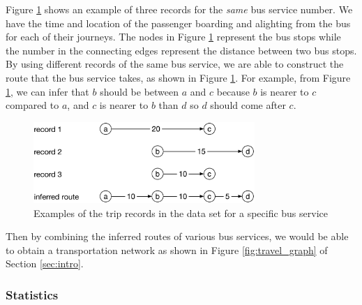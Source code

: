 \documentclass{sig-alternate}
\begin{document}
Figure \ref{fig:trip_example} shows an example of three records for the \emph{same} bus service number. We have the time and location of the passenger boarding and alighting from the bus for each of their journeys. The nodes in Figure \ref{fig:trip_example} represent the bus stops while the number in the connecting edges represent the distance between two bus stops. By using different records of the same bus service, we are able to construct the route that the bus service takes, as shown in Figure \ref{fig:trip_example}. For example, from Figure \ref{fig:trip_example}, we can infer that $b$ should be between $a$ and $c$ because $b$ is nearer to $c$ compared to $a$, and $c$ is nearer to $b$ than $d$ so $d$ should come after $c$.
\begin{figure}[htb]
	\centering
	\includegraphics[width=3.3in]{trip_example}
	\caption{Examples of the trip records in the data set for a specific bus service}
	\label{fig:trip_example}
\end{figure}
Then by combining the inferred routes of various bus services, we would be able to obtain a transportation network as shown in Figure \ref{fig:travel_graph} of Section \ref{sec:intro}. %

\subsubsection{Statistics}
\end{document}
